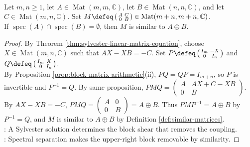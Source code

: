 \begin{corollary} \label{cor:block-upper-triangular-remove-disjoint-coupling} \\
Let $m,n\geq1$, let $A\in\operatorname{Mat}(m,m,\mathbb{C})$, let $B\in\operatorname{Mat}(n,n,\mathbb{C})$, and let $C\in\operatorname{Mat}(m,n,\mathbb{C})$. Set $M\defeq\left(\begin{smallmatrix}A&C\\0&B\end{smallmatrix}\right)\in\operatorname{Mat}(m+n,m+n,\mathbb{C})$.\\
If $\operatorname{spec}(A)\cap\operatorname{spec}(B)=\emptyset$, then $M$ is similar to $A\oplus B$.
\begin{proof}
By Theorem \ref{thm:sylvester-linear-matrix-equation}, choose $X\in\operatorname{Mat}(m,n,\mathbb{C})$ such that $AX-XB=-C$. Set $P\defeq\left(\begin{smallmatrix}I_m&-X\\0&I_n\end{smallmatrix}\right)$ and $Q\defeq\left(\begin{smallmatrix}I_m&X\\0&I_n\end{smallmatrix}\right)$.\\
By Proposition \ref{prop:block-matrix-arithmetic}(ii), $PQ=QP=I_{m+n}$, so $P$ is invertible and $P^{-1}=Q$. By same proposition, $PMQ=\left(\begin{smallmatrix}A&AX+C-XB\\0&B\end{smallmatrix}\right)$.\\
By $AX-XB=-C$, $PMQ=\left(\begin{smallmatrix}A&0\\0&B\end{smallmatrix}\right)=A\oplus B$. Thus $PMP^{-1}=A\oplus B$ by $P^{-1}=Q$, and $M$ is similar to $A\oplus B$ by Definition \ref{def:similar-matrices}.\\
: A Sylvester solution determines the block shear that removes the coupling.\\
: Spectral separation makes the upper-right block removable by similarity.
\end{proof}
\end{corollary}

